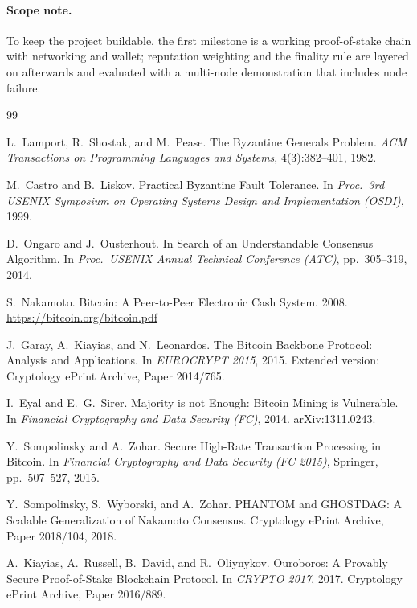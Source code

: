 \documentclass[11pt,a4paper]{article}
\begin{document}
\paragraph{Scope note.} To keep the project buildable, the first milestone is a working proof-of-stake chain with networking and wallet; reputation weighting and the finality rule are layered on afterwards and evaluated with a multi-node demonstration that includes node failure.

\begin{thebibliography}{99}\small

 L.~Lamport, R.~Shostak, and M.~Pease. The Byzantine Generals Problem. \emph{ACM Transactions on Programming Languages and Systems}, 4(3):382--401, 1982.

 M.~Castro and B.~Liskov. Practical Byzantine Fault Tolerance. In \emph{Proc.\ 3rd USENIX Symposium on Operating Systems Design and Implementation (OSDI)}, 1999.

 D.~Ongaro and J.~Ousterhout. In Search of an Understandable Consensus Algorithm. In \emph{Proc.\ USENIX Annual Technical Conference (ATC)}, pp.\ 305--319, 2014.

 S.~Nakamoto. Bitcoin: A Peer-to-Peer Electronic Cash System. 2008. \url{https://bitcoin.org/bitcoin.pdf}

 J.~Garay, A.~Kiayias, and N.~Leonardos. The Bitcoin Backbone Protocol: Analysis and Applications. In \emph{EUROCRYPT 2015}, 2015. Extended version: Cryptology ePrint Archive, Paper 2014/765.

 I.~Eyal and E.~G.~Sirer. Majority is not Enough: Bitcoin Mining is Vulnerable. In \emph{Financial Cryptography and Data Security (FC)}, 2014. arXiv:1311.0243.

 Y.~Sompolinsky and A.~Zohar. Secure High-Rate Transaction Processing in Bitcoin. In \emph{Financial Cryptography and Data Security (FC 2015)}, Springer, pp.\ 507--527, 2015.

 Y.~Sompolinsky, S.~Wyborski, and A.~Zohar. PHANTOM and GHOSTDAG: A Scalable Generalization of Nakamoto Consensus. Cryptology ePrint Archive, Paper 2018/104, 2018.

 A.~Kiayias, A.~Russell, B.~David, and R.~Oliynykov. Ouroboros: A Provably Secure Proof-of-Stake Blockchain Protocol. In \emph{CRYPTO 2017}, 2017. Cryptology ePrint Archive, Paper 2016/889.


\end{thebibliography}
\end{document}
